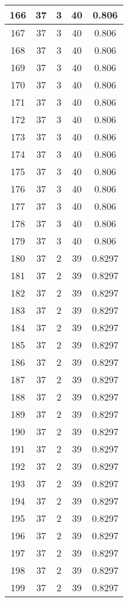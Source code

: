 \documentclass[letterpaper, 12pt]{article}
\begin{document}
\begin{longtable}{|c|c|c|c|c|}
\hline
166 & 37 & 3 & 40 & 0.806 \\
\hline
167 & 37 & 3 & 40 & 0.806 \\
\hline
168 & 37 & 3 & 40 & 0.806 \\
\hline
169 & 37 & 3 & 40 & 0.806 \\
\hline
170 & 37 & 3 & 40 & 0.806 \\
\hline
171 & 37 & 3 & 40 & 0.806 \\
\hline
172 & 37 & 3 & 40 & 0.806 \\
\hline
173 & 37 & 3 & 40 & 0.806 \\
\hline
174 & 37 & 3 & 40 & 0.806 \\
\hline
175 & 37 & 3 & 40 & 0.806 \\
\hline
176 & 37 & 3 & 40 & 0.806 \\
\hline
177 & 37 & 3 & 40 & 0.806 \\
\hline
178 & 37 & 3 & 40 & 0.806 \\
\hline
179 & 37 & 3 & 40 & 0.806 \\
\hline
180 & 37 & 2 & 39 & 0.8297 \\
\hline
181 & 37 & 2 & 39 & 0.8297 \\
\hline
182 & 37 & 2 & 39 & 0.8297 \\
\hline
183 & 37 & 2 & 39 & 0.8297 \\
\hline
184 & 37 & 2 & 39 & 0.8297 \\
\hline
185 & 37 & 2 & 39 & 0.8297 \\
\hline
186 & 37 & 2 & 39 & 0.8297 \\
\hline
187 & 37 & 2 & 39 & 0.8297 \\
\hline
188 & 37 & 2 & 39 & 0.8297 \\
\hline
189 & 37 & 2 & 39 & 0.8297 \\
\hline
190 & 37 & 2 & 39 & 0.8297 \\
\hline
191 & 37 & 2 & 39 & 0.8297 \\
\hline
192 & 37 & 2 & 39 & 0.8297 \\
\hline
193 & 37 & 2 & 39 & 0.8297 \\
\hline
194 & 37 & 2 & 39 & 0.8297 \\
\hline
195 & 37 & 2 & 39 & 0.8297 \\
\hline
196 & 37 & 2 & 39 & 0.8297 \\
\hline
197 & 37 & 2 & 39 & 0.8297 \\
\hline
198 & 37 & 2 & 39 & 0.8297 \\
\hline
199 & 37 & 2 & 39 & 0.8297 \\
\hline
\end{longtable}
\end{document}
